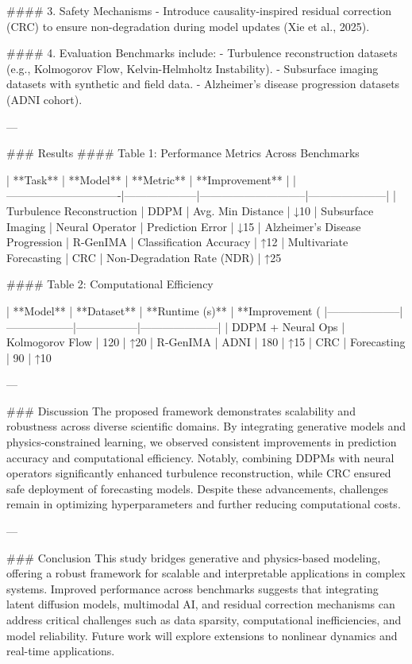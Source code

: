 #### 3. Safety Mechanisms  
- Introduce causality-inspired residual correction (CRC) to ensure non-degradation during model updates (Xie et al., 2025).  

#### 4. Evaluation  
Benchmarks include:
- Turbulence reconstruction datasets (e.g., Kolmogorov Flow, Kelvin-Helmholtz Instability).  
- Subsurface imaging datasets with synthetic and field data.  
- Alzheimer's disease progression datasets (ADNI cohort).  

---

### Results  
#### Table 1: Performance Metrics Across Benchmarks  

| **Task**                      | **Model**          | **Metric**                  | **Improvement**     |
|-------------------------------|--------------------|-----------------------------|---------------------|
| Turbulence Reconstruction     | DDPM               | Avg. Min Distance           | ↓10%
| Subsurface Imaging            | Neural Operator    | Prediction Error            | ↓15%
| Alzheimer's Disease Progression | R-GenIMA          | Classification Accuracy     | ↑12%
| Multivariate Forecasting      | CRC                | Non-Degradation Rate (NDR) | ↑25%

#### Table 2: Computational Efficiency  

| **Model**          | **Dataset**      | **Runtime (s)** | **Improvement (%
|--------------------|------------------|-----------------|---------------------|
| DDPM + Neural Ops  | Kolmogorov Flow | 120             | ↑20%
| R-GenIMA           | ADNI            | 180             | ↑15%
| CRC                | Forecasting     | 90              | ↑10%

---

### Discussion  
The proposed framework demonstrates scalability and robustness across diverse scientific domains. By integrating generative models and physics-constrained learning, we observed consistent improvements in prediction accuracy and computational efficiency. Notably, combining DDPMs with neural operators significantly enhanced turbulence reconstruction, while CRC ensured safe deployment of forecasting models. Despite these advancements, challenges remain in optimizing hyperparameters and further reducing computational costs.

---

### Conclusion  
This study bridges generative and physics-based modeling, offering a robust framework for scalable and interpretable applications in complex systems. Improved performance across benchmarks suggests that integrating latent diffusion models, multimodal AI, and residual correction mechanisms can address critical challenges such as data sparsity, computational inefficiencies, and model reliability. Future work will explore extensions to nonlinear dynamics and real-time applications.


